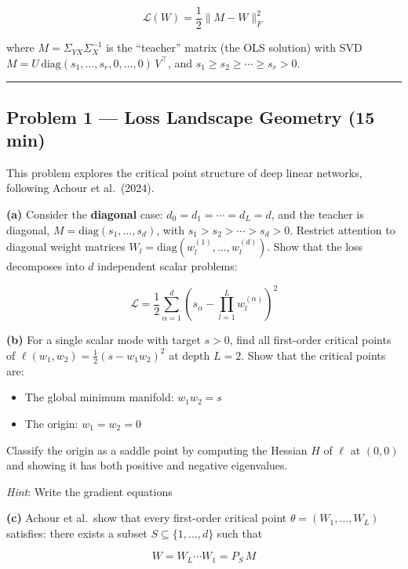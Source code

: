 \documentclass[
]{article}
\providecommand{\tightlist}{%
  \setlength{\itemsep}{0pt}\setlength{\parskip}{0pt}}
\begin{document}
\[\mathcal{L}(W) = \frac{1}{2}\|M - W\|_F^2\]

where \(M = \Sigma_{YX} \Sigma_X^{-1}\) is the ``teacher'' matrix (the
OLS solution) with SVD
\(M = U \,\text{diag}(s_1, \ldots, s_r, 0, \ldots, 0)\, V^\top\), and
\(s_1 \geq s_2 \geq \cdots \geq s_r > 0\).

\begin{center}\rule{0.5\linewidth}{0.5pt}\end{center}

\subsection{Problem 1 --- Loss Landscape Geometry (15
min)}\label{problem-1-loss-landscape-geometry-15-min}

This problem explores the critical point structure of deep linear
networks, following Achour et al.~(2024).

\textbf{(a)} Consider the \textbf{diagonal} case:
\(d_0 = d_1 = \cdots = d_L = d\), and the teacher is diagonal,
\(M = \text{diag}(s_1, \ldots, s_d)\), with
\(s_1 > s_2 > \cdots > s_d > 0\). Restrict attention to diagonal weight
matrices \(W_l = \text{diag}(w_l^{(1)}, \ldots, w_l^{(d)})\). Show that
the loss decomposes into \(d\) independent scalar problems:

\[\mathcal{L} = \frac{1}{2}\sum_{\alpha=1}^d \left(s_\alpha - \prod_{l=1}^L w_l^{(\alpha)}\right)^2\]

\textbf{(b)} For a single scalar mode with target \(s > 0\), find all
first-order critical points of
\(\ell(w_1, w_2) = \frac{1}{2}(s - w_1 w_2)^2\) at depth \(L = 2\). Show
that the critical points are:

\begin{itemize}
\tightlist
\item
  The global minimum manifold: \(w_1 w_2 = s\)
\item
  The origin: \(w_1 = w_2 = 0\)
\end{itemize}

Classify the origin as a saddle point by computing the Hessian \(H\) of
\(\ell\) at \((0,0)\) and showing it has both positive and negative
eigenvalues.

\emph{Hint}: Write the gradient equations 

\textbf{(c)} Achour et al.~show that every
first-order critical point \(\theta = (W_1, \ldots, W_L)\) satisfies:
there exists a subset \(S \subseteq \{1, \ldots, d\}\) such that

\[W = W_L \cdots W_1 = P_S\, M\]
\end{document}
